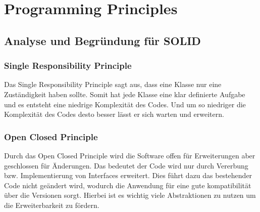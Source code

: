 \chapter{Programming Principles}
\section{Analyse und Begründung für SOLID}

\subsection{Single Responsibility Principle}
Das Single Responsibility Principle sagt aus, dass eine Klasse nur eine Zuständigkeit haben sollte.
Somit hat jede Klasse eine klar definierte Aufgabe und es entsteht eine niedrige Komplexität des Codes.
Und um so niedriger die Komplexität des Codes desto besser lässt er sich warten und erweitern.


\subsection{Open Closed Principle}
Durch das Open Closed Principle wird die Software offen für Erweiterungen aber geschlossen für Änderungen.
Das bedeutet der Code wird nur durch Vererbung bzw. Implementierung von Interfaces erweitert.
Dies führt dazu das bestehender Code nicht geändert wird, wodurch die Anwendung für eine gute kompatibilität über die Versionen sorgt.
Hierbei ist es wichtig viele Abstraktionen zu nutzen um die Erweiterbarkeit zu fördern.

